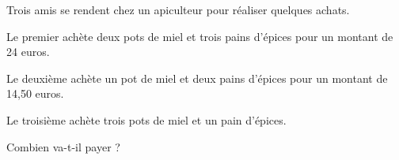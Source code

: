 
\medskip

Trois amis se rendent chez un apiculteur pour réaliser quelques achats. 
\medskip

Le premier achète deux pots de miel et trois pains d'épices pour un montant de 24 euros.

Le deuxième achète un pot de miel et deux pains d'épices pour un montant de 14,50 euros. 

Le troisième achète trois pots de miel et un pain d'épices. 

Combien va-t-il payer ? 

\vspace{0.5cm}

